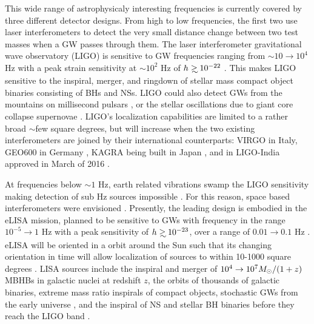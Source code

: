 This wide range of astrophysicaly interesting frequencies is currently covered
by three different detector designs. From high to low frequencies, the first
two use laser interferometers to detect the very small distance change between
two test masses when a GW passes through them. The laser interferometer
gravitational wave observatory (LIGO) is sensitive to GW frequencies ranging
from $\sim 10 \rightarrow 10^4$ Hz with a peak strain sensitivity at
$\sim10^{2}$ Hz of $h \gsim 10^{-22}$ \citep{aLIGO:2015}. This makes LIGO
sensitive to the inspiral, merger, and ringdown of stellar mass compact object
binaries consisting of BHs and NSs. LIGO could also detect GWs from the
mountains on millisecond pulsars \citep[\emph{e.g.}][and references therein]{ContWaveLIGO:2016}, 
or the stellar oscillations due to giant core
collapse supernovae \citep[\emph{e.g.}][and references therein]{SNLIGO:2016}.
LIGO's localization capabilities are limited to a rather broad $\sim$few
square degrees, but will increase when the two existing interferometers are
joined by their international counterparts: VIRGO \citep{Acernese:2015} in
Italy, GEO600 in Germany \citep{Dooley:2015}, KAGRA being built in Japan
\citep{Tomaru:2016}, and in LIGO-India approved in March of 2016 \citep{LIGO-
India}.

At frequencies below $\sim 1$ Hz, earth related vibrations swamp the LIGO
sensitivity making detection of sub Hz sources impossible \citep{aLIGO:2015}.
For this reason, space based interferometers were envisioned
\citep{ThorneBraginsky:1976}. Presently, the leading design is embodied in
the eLISA mission, planned to be sensitive to GWs with frequency in the range
$10^{-5} \rightarrow 1$ Hz with a peak sensitivity of $h \gsim 10^{-23}$, over
a range of $0.01 \rightarrow 0.1$ Hz \citep{eLISA:Amaro-Seoane:2013}. eLISA
will be oriented in a orbit around the Sun such that its changing orientation
in time will allow localization of sources to within 10-1000 square degrees
\citep{eLISA:Amaro-Seoane:2013}. LISA sources include the inspiral and merger
of $10^4 \rightarrow 10^7 {M_{\odot}}/(1+z)$ MBHBs in galactic nuclei at redshift
$z$, the orbits of thousands of galactic binaries, extreme mass ratio inspirals
of compact objects, stochastic GWs from the early universe \citep{eLISA:Amaro-
Seoane:2013}, and the inspiral of NS and stellar BH binaries before they reach
the LIGO band \citep[\emph{e.g.}][and references therein]{Sesana:LISALIGO:2016}.

